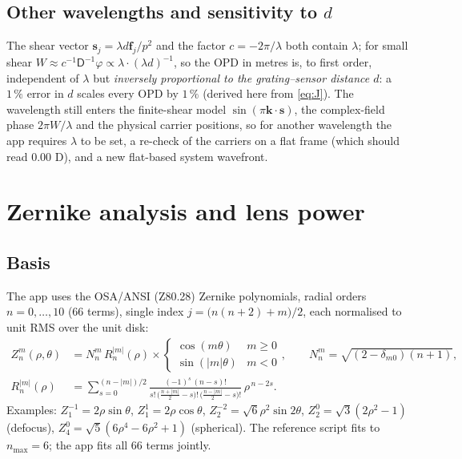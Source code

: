 \documentclass[11pt,a4paper]{article}
\theoremstyle{definition}
\newcommand{\vk}{\bm{k}}
\newcommand{\vs}{\bm{s}}
\newcommand{\vf}{\bm{f}}
\newcommand{\Dop}{\mathsf{D}}
\begin{document}
\subsection{Other wavelengths and sensitivity to $d$}
The shear vector $\vs_j=\lambda d\vf_j/p^2$ and the factor $c=-2\pi/\lambda$ both contain $\lambda$; for small shear $W\approx c^{-1}\Dop^{-1}\varphi\propto\lambda\cdot(\lambda d)^{-1}$, so the OPD in metres is, to first order, independent of $\lambda$ but \emph{inversely proportional to the grating--sensor distance $d$}: a $1\,\%$ error in $d$ scales every OPD by $1\,\%$ (derived here from \eqref{eq:J}). The wavelength still enters the finite-shear model $\sin(\pi\vk\cdot\vs)$, the complex-field phase $2\pi W/\lambda$ and the physical carrier positions, so for another wavelength the app requires $\lambda$ to be set, a re-check of the carriers on a flat frame (which should read $0.00$ D), and a new flat-based system wavefront.

\section{Zernike analysis and lens power}
\label{sec:zern}
\subsection{Basis}
The app uses the OSA/ANSI (Z80.28) Zernike polynomials, radial orders $n=0,\dots,10$ (66 terms), single index $j=\big(n(n+2)+m\big)/2$, each normalised to unit RMS over the unit disk:
\begin{align}
Z_n^m(\rho,\theta)&=N_n^m\,R_n^{|m|}(\rho)\times\begin{cases}\cos(m\theta)&m\ge0\\ \sin(|m|\theta)&m<0\end{cases},\qquad N_n^m=\sqrt{(2-\delta_{m0})(n+1)},\\
R_n^{|m|}(\rho)&=\sum_{s=0}^{(n-|m|)/2}\frac{(-1)^s\,(n-s)!}{s!\,\big(\tfrac{n+|m|}2-s\big)!\,\big(\tfrac{n-|m|}2-s\big)!}\,\rho^{\,n-2s}.
\end{align}
Examples: $Z_1^{-1}=2\rho\sin\theta$, $Z_1^{1}=2\rho\cos\theta$, $Z_2^{-2}=\sqrt6\rho^2\sin2\theta$, $Z_2^0=\sqrt3(2\rho^2-1)$ (defocus), $Z_4^0=\sqrt5(6\rho^4-6\rho^2+1)$ (spherical).
The reference script fits to $n_{\max}=6$; the app fits all $66$ terms jointly.
\end{document}
